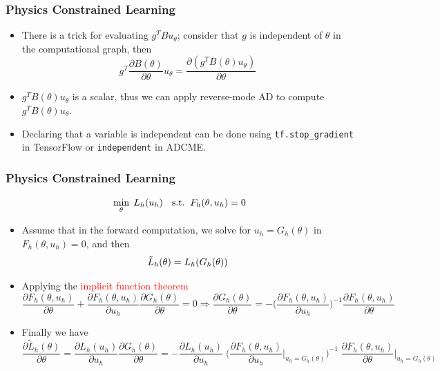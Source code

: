 \documentclass{beamer}
\begin{document}
\begin{frame}
	\frametitle{Physics Constrained Learning}
	
	\begin{itemize}
		\item There is a trick for evaluating $g^T Bu_\theta$; consider that $g$ is independent of $\theta$ in the computational graph, then 
		$$g^T \frac{\partial B(\theta)}{\partial \theta}u_\theta = \frac{\partial (g^T B(\theta) u_\theta)}{\partial \theta}$$
		\item $g^T B(\theta) u_\theta$ is a scalar, thus we can apply reverse-mode AD to compute $g^T B(\theta) u_\theta$.
		\item Declaring that a variable is independent can be done using \texttt{tf.stop\_gradient} in TensorFlow or \texttt{independent} in ADCME. 
	\end{itemize}
\end{frame}

\begin{frame}
	\frametitle{Physics Constrained Learning}
	 $${\small    \min_{\theta}\; L_h(u_h) \quad \mathrm{s.t.}\;\; F_h(\theta, u_h) = 0}$$
	\begin{itemize}
\item Assume that in the forward computation, we solve for $u_h=G_h(\theta)$ in $F_h(\theta, u_h)=0$, and then
$${\small\tilde L_h(\theta)  = L_h(G_h(\theta))}$$
\item Applying the \textcolor{red}{implicit function theorem}
{  \scriptsize
\begin{equation*}
\frac{{\partial {F_h(\theta, u_h)}}}{{\partial \theta }} + {\frac{{\partial {F_h(\theta, u_h)}}}{{\partial {u_h}}}}  \frac{\partial G_h(\theta)}{\partial \theta} = 0  \Rightarrow 
     \frac{\partial G_h(\theta)}{\partial \theta} =  -\Big( \frac{{\partial {F_h(\theta, u_h)}}}{{\partial {u_h}}} \Big)^{ - 1} \frac{{\partial {F_h(\theta, u_h)}}}{{\partial \theta }}
\end{equation*}
}
\item Finally we have
{\scriptsize
\begin{equation*}
    \boxed{\frac{{\partial {{\tilde L}_h}(\theta )}}{{\partial \theta }} 
    = \frac{\partial {{ L}_h}(u_h )}{\partial u_h}\frac{\partial G_h(\theta)}{\partial \theta}= - \frac{{\partial {L_h}({u_h})}}{{\partial {u_h}}} \;
    \Big( {\frac{{\partial {F_h(\theta, u_h)}}}{{\partial {u_h}}}\Big|_{u_h = {G_h}(\theta )}} \Big)^{ - 1} \;
    \frac{{\partial {F_h(\theta, u_h)}}}{{\partial \theta }}\Big|_{u_h = {G_h}(\theta )}}
\end{equation*}
}

	\end{itemize}
	
\end{frame}
\end{document}

